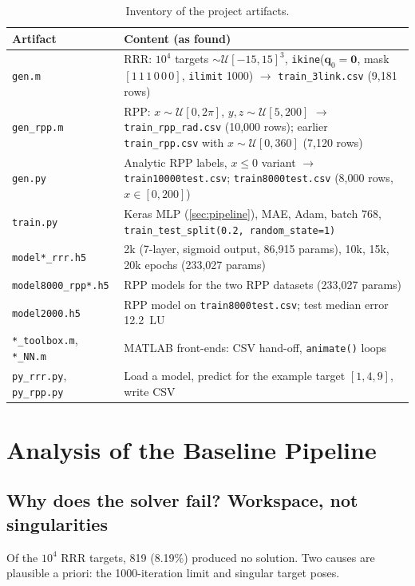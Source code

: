 \documentclass[conference]{IEEEtran}
\newcommand{\q}{\mathbf{q}}
\newcommand{\code}[1]{\texttt{#1}}
\begin{document}
\begin{table}[t]
\centering
\small
\caption{Inventory of the project artifacts.}
\label{tab:inventory}
\begin{tabularx}{\textwidth}{lX}
\toprule
Artifact & Content (as found) \\
\midrule
\code{gen.m} & RRR: $10^4$ targets $\sim\mathcal{U}[-15,15]^3$, \code{ikine}($\q_0{=}\mathbf{0}$, mask $[1\,1\,1\,0\,0\,0]$, \code{ilimit} 1000) $\to$ \code{train\_3link.csv} (9{,}181 rows) \\
\code{gen\_rpp.m} & RPP: $x\sim\mathcal{U}[0,2\pi]$, $y,z\sim\mathcal{U}[5,200]$ $\to$ \code{train\_rpp\_rad.csv} (10{,}000 rows); earlier \code{train\_rpp.csv} with $x\sim\mathcal{U}[0,360]$ (7{,}120 rows) \\
\code{gen.py} & Analytic RPP labels, $x\le0$ variant $\to$ \code{train10000test.csv}; \code{train8000test.csv} (8{,}000 rows, $x\in[0,200]$) \\
\code{train.py} & Keras MLP (\cref{sec:pipeline}), MAE, Adam, batch 768, \code{train\_test\_split(0.2, random\_state=1)} \\
\code{model*\_rrr.h5} & 2k (7-layer, sigmoid output, 86{,}915 params), 10k, 15k, 20k epochs (233{,}027 params) \\
\code{model8000\_rpp*.h5} & RPP models for the two RPP datasets (233{,}027 params) \\
\code{model2000.h5} & RPP model on \code{train8000test.csv}; test median error 12.2~LU \\
\code{*\_toolbox.m}, \code{*\_NN.m} & MATLAB front-ends: CSV hand-off, \code{animate()} loops \\
\code{py\_rrr.py}, \code{py\_rpp.py} & Load a model, predict for the example target $[1,4,9]$, write CSV \\
\bottomrule
\end{tabularx}
\end{table}

\section{Analysis of the Baseline Pipeline}
\label{sec:audit}

\subsection{Why does the solver fail? Workspace, not singularities}
\label{sec:audit-fail}

Of the $10^4$ RRR targets, 819 (8.19\%) produced no solution. Two causes are plausible a priori: the 1000-iteration limit and singular target poses.
\end{document}
